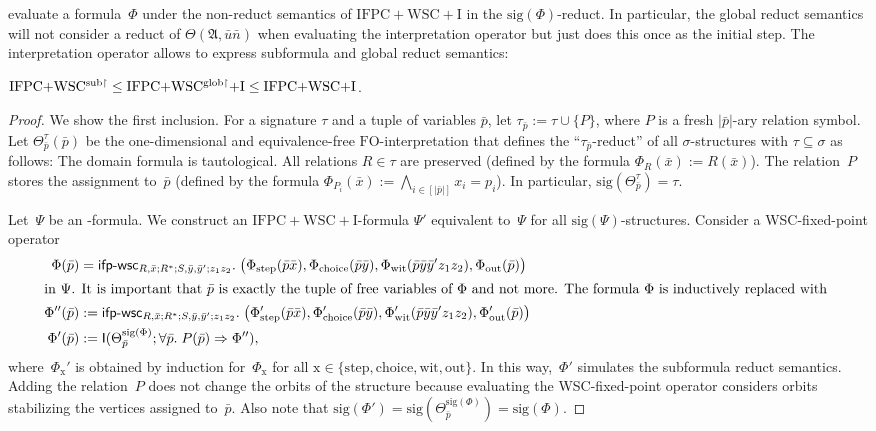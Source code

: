 \documentclass[]{lmcs}
\newcommand{\qspace}{\mathchoice{\;}{\,}{}{}}
\newcommand{\set}[1]{\lbrace #1 \rbrace}
\newcommand{\formA}{\Phi}
\newcommand{\formB}{\Psi}
\newcommand{\interpret}{\Theta}
\newcommand{\rel}{R}
\newcommand{\tup}[1]{\bar{#1}}
\newcommand{\vertA}{u}
\newcommand{\StructA}{\mathfrak{A}}
\newcommand{\sig}{\tau}
\newcommand{\sigA}{\tau}
\newcommand{\sigB}{\sigma}
\newcommand{\sigOf}[1]{\mathrm{sig}(#1)}
\newcommand{\FO}{\ensuremath{\mathrm{FO}}}
\newcommand{\IFPCWSCI}{\ensuremath{\mathrm{IFPC{+}WSC{+}I}}}
\newcommand{\formOut}{\formA_{\text{out}}}
\newcommand{\formStep}{\formA_{\text{step}}}
\newcommand{\formChoice}{\formA_{\text{choice}}}
\newcommand{\formWit}{\formA_{\text{wit}}}
\newcommand{\ifpwscSym}{\mathsf{ifp}\text{-}\mathsf{wsc}}
\newcommand{\ifpwscbig}[8]{\ifpwscSym_{#1; #2; #3; #4}.\qspace\big(#5,#6,#7, #8\big)}
\newcommand{\iop}[2]{\mathsf{I}(#1;#2)}
\begin{document}
evaluate a formula~$\formA$ under the non-reduct semantics of \IFPCWSCI{} 
in the $\sigOf{\formA}$-reduct.
In particular, the global reduct semantics
will not consider a reduct of $\interpret(\StructA, \tup{\vertA}\tup{n})$
when evaluating the interpretation operator
but just does this once as the initial step.
The interpretation operator allows to express subformula and global reduct semantics:
\begin{lem}
	\label{lem:interpretation-operator-expresses-sub-and-glob}
$\IFPCWSCsub \leq \IFPCWSCIglob{} \leq  \IFPCWSCI$.
\end{lem}
\begin{proof}
	We show the first inclusion.
	For a signature $\sig$ and a tuple of variables $\tup{p}$, 
	let $\sig_{\tup{p}} := \sig \cup \set{P}$,
	where $P$ is a fresh $|\tup{p}|$-ary relation symbol.
	Let $\interpret^\sig_{\tup{p}}(\tup{p})$ be the one-dimensional and equivalence-free \FO{}-interpretation
	that defines the ``$\sig_{\tup{p}}$-reduct'' of all $\sigB$-structures with $\sig \subseteq \sigB$ as follows:
	The domain formula is tautological.
	All relations $\rel\in \sigA$ are preserved (defined by the formula $\formA_\rel(\tup{x}) := \rel(\tup{x})$).
	The relation~$P$ stores the assignment to~$\tup{p}$ (defined by the formula $\formA_{P_i}(\tup{x}) := \bigwedge_{i \in [|\tup{p}|]} x_i = p_i$).
	In particular, $\sigOf{\interpret^\sig_{\tup{p}}} = \sig$.
	
	Let~$\formB$ be an \IFPCWSCsub{}-formula.
	We construct
	an \IFPCWSCI{}-formula $\formB'$ equivalent to~$\formB$
	for all $\sigOf{\formB}$-structures.
	Consider a WSC-fixed-point operator 
	\begin{align*}
		\formA(\tup{p})&=\ifpwscbig{R,\tup{x}}{R^*}{S,\tup{y}, \tup{y}'}{z_1z_2}{\formStep(\tup{p}\tup{x})}{\formChoice(\tup{p}\tup{y})}{\formWit(\tup{p}\tup{y}\tup{y}'z_1z_2)}{\formOut(\tup{p})}\\
		\intertext{in $\formB$. It is important that $\tup{p}$ is exactly the tuple of free variables of $\formA$ and not more.
		The formula $\formA$ is inductively replaced with
		}
		\formA''(\tup{p}) &:= \ifpwscbig{R,\tup{x}}{R^*}{S,\tup{y}, \tup{y}'}{z_1z_2}{\formStep'(\tup{p}\tup{x})}{\formChoice'(\tup{p}\tup{y})}{\formWit'(\tup{p}\tup{y}\tup{y}'z_1z_2)}{\formOut'(\tup{p})}\\
		\formA'(\tup{p}) &:=\iop{\interpret^{\sigOf{\formA}}_{\tup{p}}}{\forall \tup{p}.\qspace P(\tup{p}) \Rightarrow \formA''},
	\end{align*}
	where~$\formA_{\text{x}}'$ is obtained by induction for~$\formA_\text{x}$
	for all $\text{x} \in \set{\text{step},\text{choice},\text{wit},\text{out}}$.
	In this way,~$\formA'$ simulates the subformula reduct semantics.
	Adding the relation~$P$ does not change the orbits of the structure
	because evaluating the WSC-fixed-point operator considers orbits stabilizing the vertices assigned to~$\tup{p}$.
	Also note that $\sigOf{\formA'} = \sigOf{\interpret^{\sigOf{\formA}}_{\tup{p}}} = \sigOf{\formA}$.


\end{proof}
\end{document}
